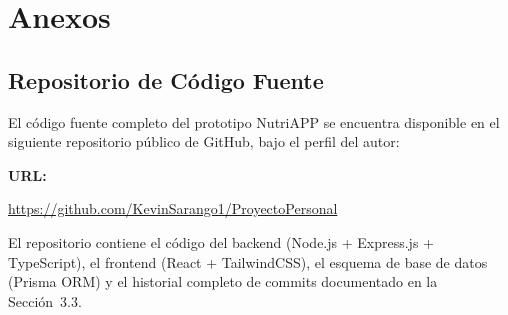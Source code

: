 \documentclass[12pt,a4paper]{article}
\begin{document}
\clearpage
\section{Anexos}

\subsection{Repositorio de Código Fuente}

El código fuente completo del prototipo NutriAPP se encuentra disponible en el siguiente
repositorio público de GitHub, bajo el perfil del autor:

\bigskip
\noindent\textbf{URL:}
\begin{center}
  \url{https://github.com/KevinSarango1/ProyectoPersonal}
\end{center}

\bigskip
\noindent El repositorio contiene el código del backend (Node.js + Express.js + TypeScript),
el frontend (React + TailwindCSS), el esquema de base de datos (Prisma ORM) y el historial
completo de commits documentado en la Sección~3.3.
\end{document}
